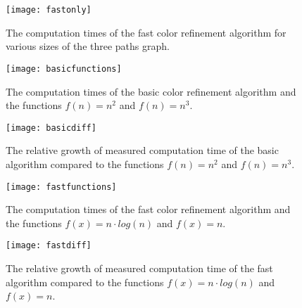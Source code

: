 \documentclass[twoside]{article}
\begin{document}
\begin{appendices}
\begin{multicols}{2}
\begin{figure}[H]
	\texttt{[image: fastonly]}
	\caption{The computation times of the fast color refinement algorithm for various sizes of the three paths graph.}
	\label{fig:fastonly}
\end{figure}

\begin{figure}[H]
	\texttt{[image: basicfunctions]}
	\caption{The computation times of the basic color refinement algorithm and the functions $f(n)=n^2$ and $f(n)=n^3$.}
	\label{fig:basicfunctions}
\end{figure}

\begin{figure}[H]
	\texttt{[image: basicdiff]}
	\caption{The relative growth of measured computation time of the basic algorithm compared to the functions $f(n)=n^2$ and $f(n)=n^3$.}
	\label{fig:basicgrowth}
\end{figure}

\begin{figure}[H]
	\texttt{[image: fastfunctions]}
	\caption{The computation times of the fast color refinement algorithm and the functions $f(x)=n\cdot log(n)$ and $f(x)=n$.}
	\label{fig:fastfunctions}
\end{figure}

\begin{figure}[H]
	\texttt{[image: fastdiff]}
	\caption{The relative growth of measured computation time of the fast algorithm compared to the functions $f(x)=n\cdot log(n)$ and $f(x)=n$.}
	\label{fig:fastgrowth}
\end{figure}
\end{multicols}

\newpage

\end{appendices}
\end{document}
